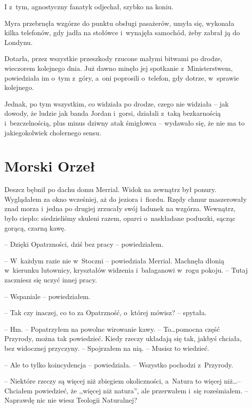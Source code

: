 \documentclass[oneside,polish,11pt,sfheadings]{mwbk}
\begin{document}
I z~tym, agnostyczny fanatyk odjechał, szybko na koniu.

Myra przebrnęła wzgórze do punktu obsługi pasażerów, umyła się, wykonała
kilka telefonów, gdy jadła na stołówce i~wynajęła samochód, żeby zabrał
ją do Londynu.

Dotarła, przez wszystkie przeszkody rzucone małymi bitwami po drodze,
wieczorem kolejnego dnia. Już dawno minęło jej spotkanie z~Ministerstwem, powiedziała im o~tym z~góry, a~oni poprosili o~telefon,
gdy dotrze, w~sprawie kolejnego.

Jednak, po tym wszystkim, co widziała po drodze, czego nie widziała -- jak dowody, że ludzie jak banda Jordan i~gorsi, działali z~taką
bezkarnością i~bezczelnością, plus minus dziwny atak śmigłowca -- wydawało się, że nie ma to jakiegokolwiek cholernego sensu.


\chapter{Morski Orzeł}

Deszcz bębnił po dachu domu Merrial. Widok na zewnątrz był ponury.
Wyglądałem za okno wcześniej, aż do jeziora i~fiordu. Rzędy chmur
maszerowały znad morza i~jedna po drugiej zrzucały swój ładunek na
wzgórza. Wewnątrz, było ciepło: siedzieliśmy skuleni razem, oparci o~naskładane poduszki, sącząc gorącą, czarną kawę.

-- Dzięki Opatrzności, dziś bez pracy -- powiedziałem.

-- W~każdym razie nie w~Stoczni -- powiedziała Merrial. Machnęła dłonią w~kierunku lutownicy, kryształów widzenia i~bałaganowi w~rogu pokoju. -- Tutaj zaczniesz się uczyć innej pracy.

-- Wspaniale -- powiedziałem.

-- Tak czy inaczej, co to za Opatrzność, o~której mówisz? -- spytała.

-- Hm. -- Popatrzyłem na powolne wirowanie kawy. -- To\ldots pomocna część
Przyrody, można tak powiedzieć. Kiedy rzeczy układają się tak, jakbyś
chciała, bez widocznej przyczyny. -- Spojrzałem na nią. -- Musisz to
wiedzieć.

-- Ale to tylko koincydencja -- powiedziała. -- Wszystko pochodzi z~Przyrody.

-- Niektóre rzeczy są więcej niż zbiegiem okoliczności, a~Natura to
więcej niż\ldots -- Chciałem powiedzieć, że ,,więcej niż natura'', ale
przerwałem i~się roześmiałem. -- Naprawdę nic nie wiesz Teologii
Naturalnej?
\end{document}
